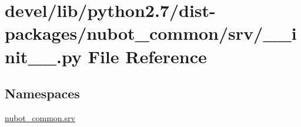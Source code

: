 \hypertarget{devel_2lib_2python2_87_2dist-packages_2nubot__common_2srv_2____init_____8py}{\section{devel/lib/python2.7/dist-\/packages/nubot\-\_\-common/srv/\-\_\-\-\_\-init\-\_\-\-\_\-.py File Reference}
\label{devel_2lib_2python2_87_2dist-packages_2nubot__common_2srv_2____init_____8py}
}
\subsection*{Namespaces}
\begin{DoxyCompactItemize}
\item 
\hyperlink{namespacenubot__common_1_1srv}{nubot\-\_\-common.\-srv}
\end{DoxyCompactItemize}
